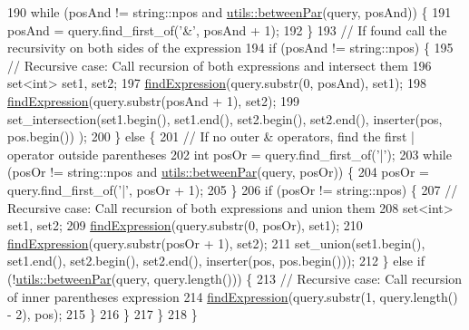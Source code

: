\begin{DoxyCode}
190         \textcolor{keywordflow}{while} (posAnd != string::npos and \hyperlink{namespaceutils_a1e1de2e5772bffdfe2c8d3309a61ddab}{utils::betweenPar}(query, posAnd)) \{
191             posAnd = query.find\_first\_of(\textcolor{charliteral}{'&'}, posAnd + 1);
192         \}
193         \textcolor{comment}{// If found call the recursivity on both sides of the expression}
194         \textcolor{keywordflow}{if} (posAnd != string::npos) \{
195             \textcolor{comment}{// Recursive case: Call recursion of both expressions and intersect them}
196             set<int> set1, set2;
197             \hyperlink{class_book_acc3fa87ab1c8eb2186a4c2e1e541f368}{findExpression}(query.substr(0, posAnd), set1);
198             \hyperlink{class_book_acc3fa87ab1c8eb2186a4c2e1e541f368}{findExpression}(query.substr(posAnd + 1), set2);
199             set\_intersection(set1.begin(), set1.end(), set2.begin(), set2.end(), inserter(pos, pos.begin())
      );
200         \} \textcolor{keywordflow}{else} \{
201             \textcolor{comment}{// If no outer & operators, find the first | operator outside parentheses}
202             \textcolor{keywordtype}{int} posOr = query.find\_first\_of(\textcolor{charliteral}{'|'});
203             \textcolor{keywordflow}{while} (posOr != string::npos and \hyperlink{namespaceutils_a1e1de2e5772bffdfe2c8d3309a61ddab}{utils::betweenPar}(query, posOr)) \{
204                 posOr = query.find\_first\_of(\textcolor{charliteral}{'|'}, posOr + 1);
205             \}
206             \textcolor{keywordflow}{if} (posOr != string::npos) \{
207                 \textcolor{comment}{// Recursive case: Call recursion of both expressions and union them}
208                 set<int> set1, set2;
209                 \hyperlink{class_book_acc3fa87ab1c8eb2186a4c2e1e541f368}{findExpression}(query.substr(0, posOr), set1);
210                 \hyperlink{class_book_acc3fa87ab1c8eb2186a4c2e1e541f368}{findExpression}(query.substr(posOr + 1), set2);
211                 set\_union(set1.begin(), set1.end(), set2.begin(), set2.end(), inserter(pos, pos.begin()));
212             \} \textcolor{keywordflow}{else} \textcolor{keywordflow}{if} (!\hyperlink{namespaceutils_a1e1de2e5772bffdfe2c8d3309a61ddab}{utils::betweenPar}(query, query.length())) \{
213                 \textcolor{comment}{// Recursive case: Call recursion of inner parentheses expression}
214                 \hyperlink{class_book_acc3fa87ab1c8eb2186a4c2e1e541f368}{findExpression}(query.substr(1, query.length() - 2), pos);
215             \}
216         \}
217     \}
218 \}
\end{DoxyCode}

